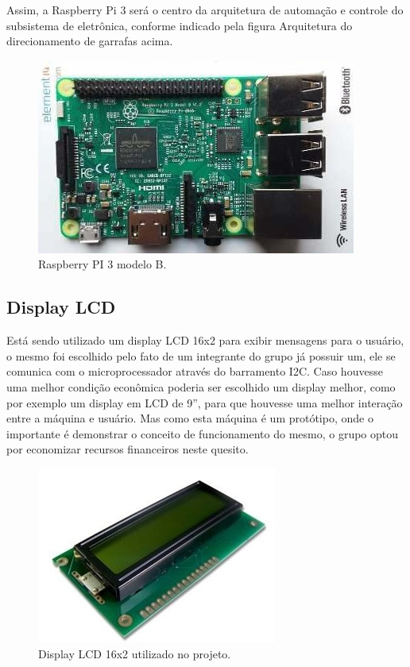 Assim, a Raspberry Pi 3 será o centro da arquitetura de automação e controle do subsistema de eletrônica, conforme indicado pela figura {\color{red} Arquitetura do direcionamento de garrafas} acima.

\begin{figure}[!ht]
	\centering
		\includegraphics[scale=0.5]{figuras/eletronica/3-Raspberry-PI.jpg}
	\caption{Raspberry PI 3 modelo B.}
\end{figure}

\subsection{Display LCD}
Está sendo utilizado um display LCD 16x2 para exibir mensagens para o usuário, o mesmo foi escolhido pelo fato de um integrante do grupo já possuir um, ele se comunica com o microprocessador através do barramento I2C. Caso houvesse uma melhor condição econômica poderia ser escolhido um display melhor, como por exemplo um display em LCD de 9”, para que houvesse uma melhor interação entre a máquina e usuário. Mas como esta máquina é um protótipo, onde o importante é demonstrar o conceito de funcionamento do mesmo, o grupo optou por economizar recursos financeiros neste quesito.

\begin{figure}[!ht]
	\centering
		\includegraphics[scale=0.5]{figuras/eletronica/4-Display-LCD.jpg}
	\caption{Display LCD 16x2 utilizado no projeto.}
\end{figure}

